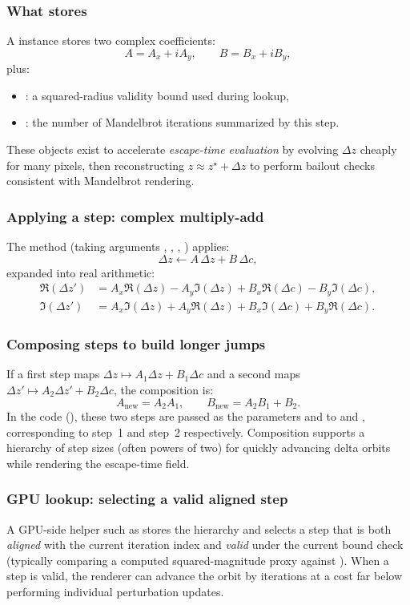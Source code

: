 \subsubsection{What  stores}
A  instance stores two complex coefficients:
\[
A = A_x + iA_y,\qquad B = B_x + iB_y,
\]
plus:
\begin{itemize}
  \item {}: a squared-radius validity bound used during lookup,
  \item {}: the number of Mandelbrot iterations summarized by this step.
\end{itemize}
These objects exist to accelerate \emph{escape-time evaluation} by evolving
\(\Delta z\) cheaply for many pixels, then reconstructing \(z \approx z^\star +
\Delta z\) to perform bailout checks consistent with Mandelbrot rendering.

\subsubsection{Applying a step: complex multiply-add}
The method  (taking arguments
, ,
, )
applies:
\[
\Delta z \leftarrow A\,\Delta z + B\,\Delta c,
\]
expanded into real arithmetic:
\begin{align}
\Re(\Delta z') &= A_x \Re(\Delta z) - A_y \Im(\Delta z) + B_x \Re(\Delta c) - B_y \Im(\Delta c), \\
\Im(\Delta z') &= A_x \Im(\Delta z) + A_y \Re(\Delta z) + B_x \Im(\Delta c) + B_y \Re(\Delta c).
\end{align}

\subsubsection{Composing steps to build longer jumps}
If a first step maps \(\Delta z \mapsto A_1\Delta z + B_1\Delta c\) and a second maps
\(\Delta z' \mapsto A_2\Delta z' + B_2\Delta c\), the composition is:
\[
A_{\text{new}} = A_2 A_1,\qquad B_{\text{new}} = A_2 B_1 + B_2.
\]
In the code (), these two steps are passed as the parameters
 and  to  and , corresponding to
step~1 and step~2 respectively.
Composition supports a hierarchy of step sizes (often powers of two) for quickly
advancing delta orbits while rendering the escape-time field.

\subsubsection{GPU lookup: selecting a valid aligned step}
A GPU-side helper such as  stores the hierarchy and selects a
step that is both \emph{aligned} with the current iteration index and
\emph{valid} under the current bound check (typically comparing a computed
squared-magnitude proxy  against ). When a step is valid, the
renderer can advance the orbit by  iterations at a cost far below
performing  individual perturbation updates.

